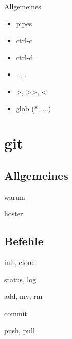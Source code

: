 \documentclass[t]{beamer}
\begin{document}
      \begin{frame}{Allgemeines}
        \begin{itemize}
          \item pipes\\
          \item ctrl-c\\
          \item ctrl-d\\
          \item .., .\\
          \item >, >>, <\\
          \item glob (*, ...)
        \end{itemize}
      \end{frame}

  \section{git}
    \subsection{Allgemeines}
      \begin{frame}{warum}
      \end{frame}

      \begin{frame}{hoster}
      \end{frame}

    \subsection{Befehle}
      \begin{frame}{init, clone}
      \end{frame}

      \begin{frame}{status, log}
      \end{frame}

      \begin{frame}{add, mv, rm}
      \end{frame}
      
      \begin{frame}{commit}
      \end{frame}
      
      \begin{frame}{push, pull}
      \end{frame}
      
\end{document}
